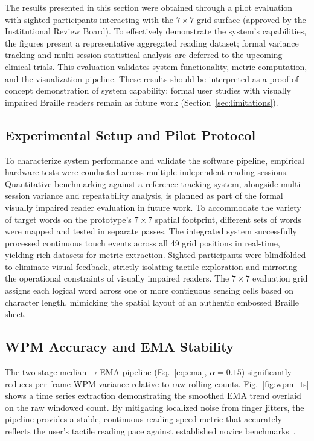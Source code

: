 \documentclass[conference]{IEEEtran}
\begin{document}
    The results presented in this section were obtained through a
    pilot evaluation with sighted participants interacting
    with the $7\times7$ grid surface (approved by the Institutional Review Board). To effectively demonstrate the system's capabilities, the figures present a representative aggregated reading dataset; formal variance tracking and multi-session statistical analysis are deferred to the upcoming clinical trials. This evaluation validates system functionality, metric computation, and the visualization pipeline. These results should be
    interpreted as a proof-of-concept demonstration of system
    capability; formal user studies with visually impaired Braille
    readers remain as future work (Section~\ref{sec:limitations}).

    \subsection{Experimental Setup and Pilot Protocol}

    To characterize system performance and validate the software pipeline, empirical hardware tests were conducted across multiple independent reading sessions. Quantitative benchmarking against a reference tracking system, alongside multi-session variance and repeatability analysis, is planned as part of the formal visually impaired reader evaluation in future work. To accommodate the variety of target words on the prototype's $7\times7$ spatial footprint, different sets of words were mapped and tested in separate passes. The integrated system successfully processed continuous touch events across all 49 grid positions in real-time, yielding rich datasets for metric extraction. Sighted participants were blindfolded to eliminate visual feedback, strictly isolating tactile exploration and mirroring the operational constraints of visually impaired readers. The $7\times7$ evaluation grid assigns each logical word across one or more contiguous sensing cells based on character length, mimicking the spatial layout of an authentic embossed Braille sheet.

    \subsection{WPM Accuracy and EMA Stability}

    The two-stage median$\to$EMA pipeline (Eq.~\ref{eq:ema}, $\alpha=0.15$) significantly reduces per-frame WPM variance relative to raw rolling counts. Fig.~\ref{fig:wpm_ts} shows a time series extraction demonstrating the smoothed EMA trend overlaid on the raw windowed count. By mitigating localized noise from finger jitters, the pipeline provides a stable, continuous reading speed metric that accurately reflects the user's tactile reading pace against established novice benchmarks~\cite{b12}.
\end{document}
